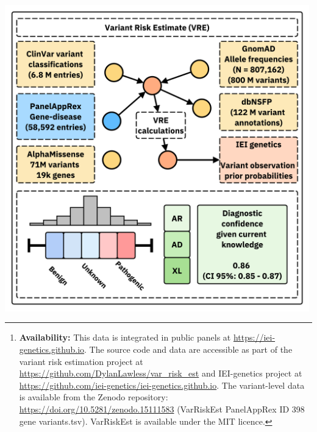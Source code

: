 \begin{abstract} 
We present a framework to quantify the prior probability of observing disease-causing variants across all genes and inheritance modes. First, we computed genome-wide occurrence probabilities by integrating population allele frequencies, variant classifications, and Hardy-Weinberg expectations under autosomal dominant, recessive, and X-linked inheritance. 
Second, both pathogenic variants and missing causal candidates are tested to identify the most likely genetic disease determinant and provide a clear confidence range for the overall diagnosis. 
This offer a complete and interpretable summary of evidence.
Third, we summarised variant probabilities for 557 genes responsible for inborn errors of immunity (IEI), now integrated into a public database. Fourth, we derived new data-driven IEI classifications using protein-protein interactions and curated clinical features, aligned to immunophenotypes. Finally, we validated the framework in national-scale cohorts of autosomal dominant, recessive, and X-linked disorders, showing close concordance with observed case numbers. The resulting datasets support Bayesian variant interpretation and evidence-weighted decision-making in clinical genetics.
\footnote{
\noindent \textbf{Availability:} This data is integrated in public panels at 
\url{https://iei-genetics.github.io}.
The source code and data are accessible as part of the variant risk estimation project at \url{https://github.com/DylanLawless/var_risk_est} and IEI-genetics project at
\url{https://github.com/iei-genetics/iei-genetics.github.io}.
The variant-level data is available from the Zenodo repository: 
\url{https://doi.org/10.5281/zenodo.15111583}
(VarRiskEst PanelAppRex ID 398 gene variants.tsv).
VarRiskEst is available under the MIT licence.}
\end{abstract}

\noindent\includegraphics[width=0.99\textwidth]{../images/var_risk_est_ci.pdf}

